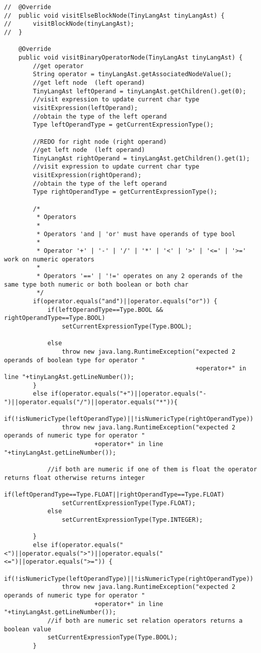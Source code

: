 \begin{lstlisting}[basicstyle=\miniscule,caption=Semantic Analyser,label=listing:semanticanalyser]
//	@Override
//	public void visitElseBlockNode(TinyLangAst tinyLangAst) {
//		visitBlockNode(tinyLangAst);
//	}

	@Override
	public void visitBinaryOperatorNode(TinyLangAst tinyLangAst) {
		//get operator 
		String operator = tinyLangAst.getAssociatedNodeValue();
		//get left node  (left operand)
		TinyLangAst leftOperand = tinyLangAst.getChildren().get(0);
		//visit expression to update current char type
		visitExpression(leftOperand);
		//obtain the type of the left operand
		Type leftOperandType = getCurrentExpressionType();
		
		//REDO for right node (right operand)
		//get left node  (left operand)
		TinyLangAst rightOperand = tinyLangAst.getChildren().get(1);
		//visit expression to update current char type
		visitExpression(rightOperand);
		//obtain the type of the left operand
		Type rightOperandType = getCurrentExpressionType();
		
		/* 
		 * Operators 
		 * 
		 * Operators 'and | 'or' must have operands of type bool
		 * 
		 * Operator '+' | '-' | '/' | '*' | '<' | '>' | '<=' | '>=' work on numeric operators  
		 *
		 * Operators '==' | '!=' operates on any 2 operands of the same type both numeric or both boolean or both char
		 */
		if(operator.equals("and")||operator.equals("or")) {
			if(leftOperandType==Type.BOOL && rightOperandType==Type.BOOL)
				setCurrentExpressionType(Type.BOOL);
			
			else 
				throw new java.lang.RuntimeException("expected 2 operands of boolean type for operator "
													 +operator+" in line "+tinyLangAst.getLineNumber());
		}
		else if(operator.equals("+")||operator.equals("-")||operator.equals("/")||operator.equals("*")){
			if(!isNumericType(leftOperandType)||!isNumericType(rightOperandType))
				throw new java.lang.RuntimeException("expected 2 operands of numeric type for operator "
						 +operator+" in line "+tinyLangAst.getLineNumber());
			
			//if both are numeric if one of them is float the operator returns float otherwise returns integer
			if(leftOperandType==Type.FLOAT||rightOperandType==Type.FLOAT)
				setCurrentExpressionType(Type.FLOAT);
			else 
				setCurrentExpressionType(Type.INTEGER);
		
		}
		else if(operator.equals("<")||operator.equals(">")||operator.equals("<=")||operator.equals(">=")) {
			if(!isNumericType(leftOperandType)||!isNumericType(rightOperandType))
				throw new java.lang.RuntimeException("expected 2 operands of numeric type for operator "
						 +operator+" in line "+tinyLangAst.getLineNumber());
			//if both are numeric set relation operators returns a boolean value
			setCurrentExpressionType(Type.BOOL);
		}
	

\end{lstlisting}
